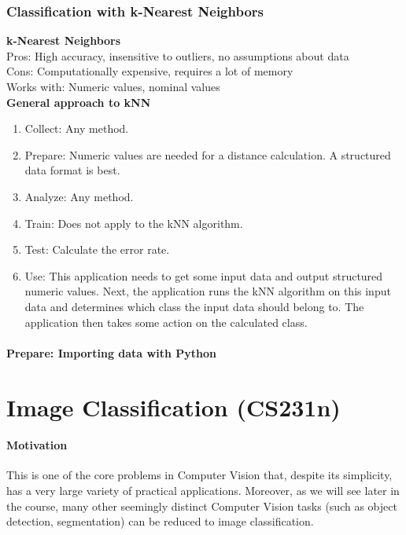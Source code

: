 \documentclass{article}
\begin{document}
\subsubsection{Classification with k-Nearest Neighbors}

\textbf{k-Nearest Neighbors} \\
Pros: High accuracy, insensitive to outliers, no assumptions about data \\
Cons: Computationally expensive, requires a lot of memory \\
Works with: Numeric values, nominal values \\

\textbf{General approach to kNN} \\
\begin{enumerate}
	\item Collect: Any method. \\
	\item Prepare: Numeric values are needed for a distance calculation. A structured data format is best. \\
	\item Analyze: Any method. \\
	\item Train: Does not apply to the kNN algorithm. \\
	\item Test: Calculate the error rate. \\
	\item Use: This application needs to get some input data and output structured numeric values. Next, the application runs the kNN algorithm on this input data and determines which class the input data should belong to. The application then takes some action on the calculated class.
\end{enumerate}

\paragraph{Prepare: Importing data with Python}


\section{Image Classification (CS231n)}
\paragraph{Motivation} This is one of the core problems in Computer Vision that, despite its simplicity, has a very large variety of practical applications. Moreover, as we will see later in the course, many other seemingly distinct Computer Vision tasks (such as object detection, segmentation) can be reduced to image classification.
\end{document}
